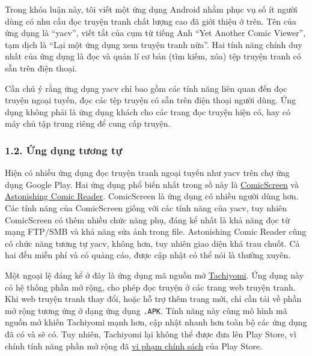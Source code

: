 Trong khóa luận này, tôi viết một ứng dụng Android nhằm phục vụ số ít
người dùng có nhu cầu đọc truyện tranh chất lượng cao đã giới thiệu ở
trên. Tên của ứng dụng là ``yacv'', viết tắt của cụm từ tiếng Anh ``Yet
Another Comic Viewer'', tạm dịch là ``Lại một ứng dụng xem truyện tranh
nữa''. Hai tính năng chính duy nhất của ứng dụng là đọc và quản lí cơ
bản (tìm kiếm, xóa) tệp truyện tranh có sẵn trên điện thoại.

Cần chú ý rằng ứng dụng yacv chỉ bao gồm các tính năng liên quan đến đọc
truyện ngoại tuyến, đọc các tệp truyện có sẵn trên điện thoại người
dùng. Ứng dụng không phải là ứng dụng khách cho các trang đọc truyện
hiện có, hay có máy chủ tập trung riêng để cung cấp truyện.

\hypertarget{ux1ee9ng-dux1ee5ng-tux1b0ux1a1ng-tux1ef1}{%
  \subsubsection{\texorpdfstring{1.2. Ứng dụng tương tự
    }{1.2. Ứng dụng tương tự }}\label{ux1ee9ng-dux1ee5ng-tux1b0ux1a1ng-tux1ef1}}

Hiện có nhiều ứng dụng đọc truyện tranh ngoại tuyến như yacv trên chợ
ứng dụng Google Play. Hai ứng dụng phổ biến nhất trong số này là
\href{https://play.google.com/store/apps/details?id=com.viewer.comicscreen\&hl=en\&gl=US}{ComicScreen}
và
\href{https://play.google.com/store/apps/details?id=com.aerilys.acr.android\&hl=en\&gl=US}{Astonishing
  Comic Reader}. ComicScreen là ứng dụng có nhiều người dùng hơn. Các tính
năng của ComicScreen giống với các tính năng của yacv, tuy nhiên
ComicScreen có thêm nhiều chức năng phụ, đáng kể nhất là khả năng đọc từ
mạng FTP/SMB và khả năng sửa ảnh trong file. Astonishing Comic Reader
cũng có chức năng tương tự yacv, không hơn, tuy nhiên giao diện khá trau
chuốt. Cả hai đều miễn phí và có quảng cáo, được cập nhật có thể nói là
thường xuyên.

Một ngoại lệ đáng kể ở đây là ứng dụng mã nguồn mở
\href{https://github.com/tachiyomiorg/tachiyomi}{Tachiyomi}. Ứng dụng
này có hệ thống phần mở rộng, cho phép đọc truyện ở các trang web truyện
tranh. Khi web truyện tranh thay đổi, hoặc hỗ trợ thêm trang mới, chỉ
cần tải về phần mở rộng tương ứng ở dạng ứng dụng \texttt{.APK}. Tính
năng này cùng mô hình mã nguồn mở khiến Tachiyomi mạnh hơn, cập nhật
nhanh hơn toàn bộ các ứng dụng đã có và sẽ có. Tuy nhiên, Tachiyomi lại
không thể được đưa lên Play Store, vì chính tính năng phần mở rộng đã
\href{https://github.com/tachiyomiorg/tachiyomi/issues/1745}{vi phạm
  chính sách} của Play Store.

